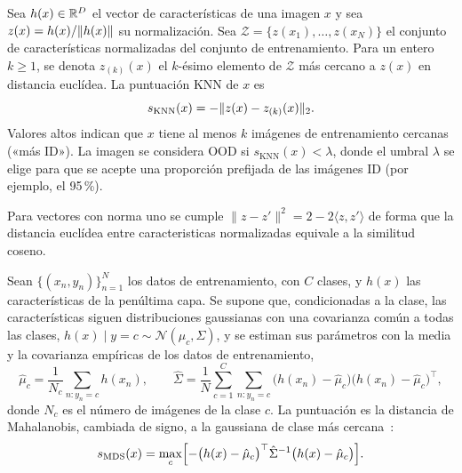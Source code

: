 \begin{definicion}\label{def:knn}
Sea $h(x) \in \mathbb{R}^D$ el vector de características de una imagen $x$ y sea
$z(x) = h(x)/\lVert h(x)\rVert$ su normalización. Sea
$\mathcal{Z} = \{z(x_1), \ldots, z(x_N)\}$ el conjunto de características normalizadas
del conjunto de entrenamiento. Para un entero $k \geq 1$, se denota $z_{(k)}(x)$ el
$k$-ésimo elemento de $\mathcal{Z}$ más cercano a $z(x)$ en distancia euclídea. La
puntuación KNN de $x$ es
\begin{equation}
  s_{\mathrm{KNN}}(x) = -\lVert z(x) - z_{(k)}(x)\rVert_2 .
\end{equation}
Valores altos indican que $x$ tiene al menos $k$ imágenes de entrenamiento cercanas
(«más ID»). La imagen se considera OOD si $s_{\mathrm{KNN}}(x) < \lambda$, donde el
umbral $\lambda$ se elige para que se acepte una proporción prefijada de las imágenes
ID (por ejemplo, el 95\,\%).

Para vectores con norma uno se cumple $\|z - z'\|^2 = 2 - 2 \langle z, z' \rangle$ de forma que la distancia euclídea entre
caracteristicas normalizadas equivale a la similitud coseno.
\end{definicion}

\begin{definicion}\label{def:mds}
Sean $\{(x_n, y_n)\}_{n=1}^{N}$ los datos de entrenamiento, con $C$ clases, y $h(x)$ las características de la penúltima capa. Se supone que, condicionadas a la clase, las características siguen distribuciones gaussianas con una covarianza común a todas las clases, $h(x) \mid y = c \sim \mathcal{N}(\mu_c, \Sigma)$, y se estiman sus parámetros con la media y la covarianza empíricas de los datos de entrenamiento,
\[
  \hat\mu_c = \frac{1}{N_c} \sum_{n : y_n = c} h(x_n), \qquad
  \hat\Sigma = \frac{1}{N} \sum_{c=1}^{C} \sum_{n : y_n = c} \bigl(h(x_n) - \hat\mu_c\bigr)\bigl(h(x_n) - \hat\mu_c\bigr)^{\top},
\]
donde $N_c$ es el número de imágenes de la clase $c$. La puntuación es la distancia de Mahalanobis, cambiada de signo, a la gaussiana de clase más cercana~\cite[sec.~2.1, ecs.~(1)--(2)]{lee2018}:
\[
  s_{\mathrm{MDS}}(x) = \max_{c} \Bigl[ -\bigl(h(x) - \hat\mu_c\bigr)^{\top} \hat\Sigma^{-1} \bigl(h(x) - \hat\mu_c\bigr) \Bigr].
\]
\end{definicion}

